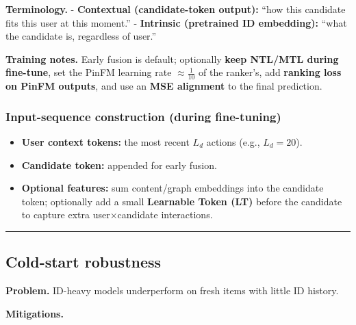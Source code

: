 \documentclass[
  letterpaper,
  DIV=11,
  numbers=noendperiod]{scrartcl}
\providecommand{\tightlist}{%
  \setlength{\itemsep}{0pt}\setlength{\parskip}{0pt}}
\begin{document}
\textbf{Terminology.} - \textbf{Contextual (candidate-token output):}
``how this candidate fits this user at this moment.'' -
\textbf{Intrinsic (pretrained ID embedding):} ``what the candidate is,
regardless of user.''

\textbf{Training notes.} Early fusion is default; optionally
\textbf{keep NTL/MTL during fine-tune}, set the PinFM learning rate
\(\approx \tfrac{1}{10}\) of the ranker's, add \textbf{ranking loss on
PinFM outputs}, and use an \textbf{MSE alignment} to the final
prediction.

\subsubsection{Input-sequence construction (during
fine-tuning)}\label{input-sequence-construction-during-fine-tuning}

\begin{itemize}
\tightlist
\item
  \textbf{User context tokens:} the most recent \(L_d\) actions (e.g.,
  \(L_d=20\)).
\item
  \textbf{Candidate token:} appended for early fusion.
\item
  \textbf{Optional features:} sum content/graph embeddings into the
  candidate token; optionally add a small \textbf{Learnable Token (LT)}
  before the candidate to capture extra user×candidate interactions.
\end{itemize}

\begin{center}\rule{0.5\linewidth}{0.5pt}\end{center}

\subsection{Cold-start robustness}\label{cold-start-robustness}

\textbf{Problem.} ID-heavy models underperform on fresh items with
little ID history.

\textbf{Mitigations.}
\end{document}
